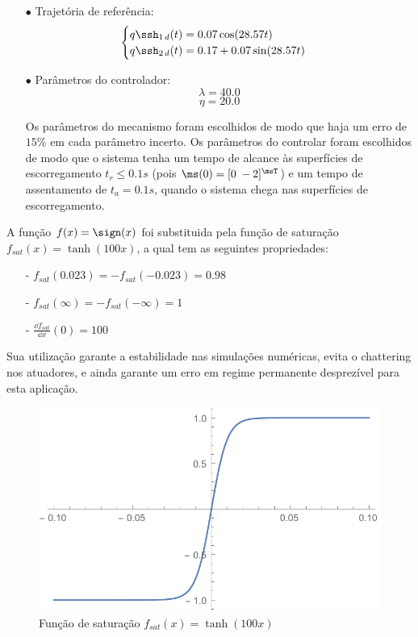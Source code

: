 \documentclass[]{politex}
\begin{document}
\begin{itemize}
\begin{itemize}
\item[$\bullet$] Trajetória de referência:
\begin{equation}
\begin{cases}
q\ssh_{1 \, d}(t) = 0.07 \cos(28.57 t) \\
q\ssh_{2 \, d}(t) = 0.17 + 0.07 \sin(28.57 t) \\
\end{cases}
\end{equation}

\item[$\bullet$] Parâmetros do controlador:
$$ \lambda = 40.0 $$
$$ \eta = 20.0 $$

Os parâmetros do mecanismo foram escolhidos de modo que haja um erro de $15\%$ em cada parâmetro incerto.
Os parâmetros do controlar foram escolhidos de modo que o sistema tenha um tempo de alcance às superfícies de escorregamento $t_r  \leq 0.1 s$ (pois $\ms(0) = [0 \; -2]^\msT$) e um tempo de assentamento de $t_a = 0.1 s$, quando o sistema chega nas superfícies de escorregamento. \\
\end{itemize}

A função $f(x) = \sign(x)$ foi substituida pela função de saturação $f_{sat}(x) = \tanh(100 x)$, a qual tem as seguintes propriedades:
\begin{itemize}
\item[-] $f_{sat}(0.023) = -f_{sat}(-0.023) = 0.98$
\item[-] $f_{sat}(\infty) = -f_{sat}(-\infty) = 1$
\item[-] $ \frac{\dd f_{sat}}{\dd x} (0) = 100$
\end{itemize}

Sua utilização garante a estabilidade nas simulações numéricas, evita o chattering nos atuadores, e ainda garante um erro em regime permanente desprezível para esta aplicação.

\begin{figure}[h]
	\centering
	\includegraphics[scale=0.4]{../figures/Tanh.pdf}  
	\caption{Função de saturação $f_{sat}(x) = \tanh(100 x)$}
	\label{fig:Tanh}
\end{figure}

\end{itemize}
\end{document}

